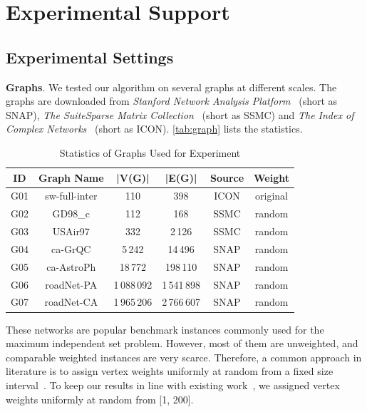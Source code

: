 \documentclass[sigconf, nonacm]{acmart}
\begin{document}
\section{Experimental Support}

\subsection{Experimental Settings}

\noindent\textbf{Graphs}. We tested our algorithm on several graphs at different scales. The graphs are downloaded from \emph{Stanford Network Analysis Platform}~\cite{snapnets} (short as SNAP), \emph{The SuiteSparse Matrix Collection}~\cite{2011The} (short as SSMC) and \emph{The Index of Complex Networks}~\cite{iconnets} (short as ICON). \autoref{tab:graph} lists the statistics.

\begin{table}[htbp]%
  \caption{Statistics of Graphs Used for Experiment}
  \label{tab:graph}
  \begin{tabular}{cccccc}
    \toprule
    \textbf{ID} & \textbf{Graph Name} & \textbf{|V(G)|} & \textbf{|E(G)|} & \textbf{Source} & \textbf{Weight}\\
    \midrule
    G01 & sw-full-inter & 110 & 398 & ICON & original\\
    G02 & GD98\_c & 112 & 168 & SSMC & random\\
    G03 & USAir97 & 332 & 2\,126 & SSMC & random\\
    G04 & ca-GrQC & 5\,242 & 14\,496 & SNAP & random\\
    G05 & ca-AstroPh & 18\,772 & 198\,110 & SNAP & random\\
    G06 & roadNet-PA & 1\,088\,092 & 1\,541\,898 & SNAP & random\\
    G07 & roadNet-CA & 1\,965\,206 & 2\,766\,607 & SNAP & random\\
  \bottomrule
\end{tabular}
\end{table}

These networks are popular benchmark instances commonly used for the maximum independent set problem. However, most of them are unweighted, and comparable weighted instances are very scarce. Therefore, a common approach in literature is to assign vertex weights uniformly at random from a fixed size interval~\cite{2018Improving,2017An}. To keep our results in line with existing work~\cite{Lamm0SWZ19}, we assigned vertex weights uniformly at random from [1, 200].
\end{document}
